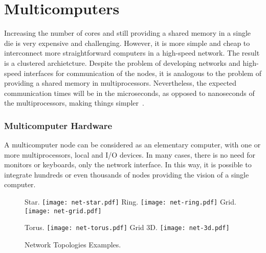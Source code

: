 	\section{Multicomputers}
	\label{sec.multicomputers}

		Increasing the number of cores and still providing a shared memory in a
		single die is very expensive and challenging.
		However, it is more simple and cheap to interconnect more straightforward
		computers in a high-speed network. The result is a clustered archietcture.
		Despite the problem of developing networks and high-speed interfaces
		for communication of the nodes, it is analogous to the problem of
		providing a shared memory in multiprocessors.
		Nevertheless, the expected communication times will be in the
		microseconds, as opposed to nanoseconds of the multiprocessors,
		making things simpler~\cite{tanenbaum:4ed}.

			\subsubsection{Multicomputer Hardware}
			\label{sec.multicomputers-hw}

				A multicomputer node can be considered as an elementary computer, with one or
				more multiprocessors, local \ram and I/O devices.
				In many cases, there is no need for monitors or keyboards, only the
				network interface.
				In this way, it is possible to integrate hundreds or even thousands
				of nodes providing the vision of a single computer.

				\begin{figure}[t]
					\centering%
					\caption{Network Topologies Examples.}%
					\label{fig:net-topologies}%

						{Star.}%
						{\texttt{[image: net-star.pdf]}}%
					\hspace{1cm}%
						{Ring.}%
						{\texttt{[image: net-ring.pdf]}}%
					\hspace{1cm}%
						{Grid.}%
						{\texttt{[image: net-grid.pdf]}}%

						{Torus.}%
						{\texttt{[image: net-torus.pdf]}}%
					\hspace{1cm}%
						{Grid 3D.}%
						{\texttt{[image: net-3d.pdf]}}%

				\end{figure}

